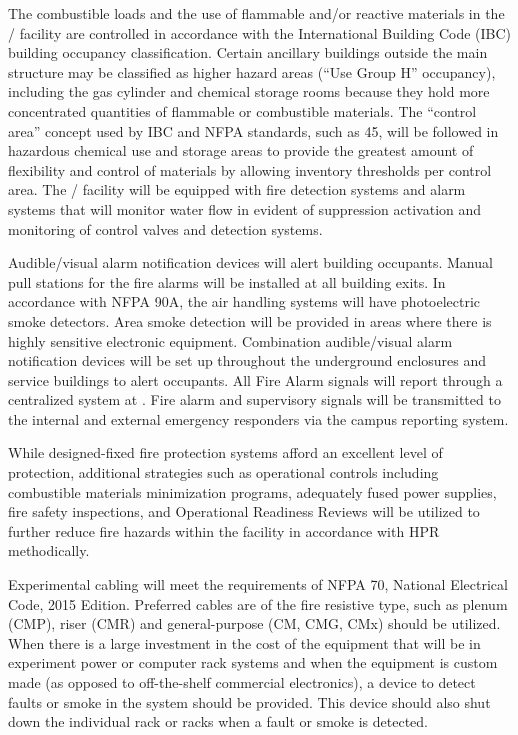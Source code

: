The combustible loads and the use of flammable and/or reactive
materials in the / facility are controlled in accordance with
the International Building Code (IBC) building occupancy
classification. Certain ancillary buildings outside the main structure
may be classified as higher hazard areas (``Use Group H'' occupancy),
including the gas cylinder and chemical storage rooms because they
hold more concentrated quantities of flammable or combustible
materials.  The ``control area'' concept used by IBC and NFPA standards,
such as 45, will be followed in hazardous chemical use and storage
areas to provide the greatest amount of flexibility and control of
materials by allowing inventory thresholds per control area.  The
/ facility will be equipped with fire detection systems and
alarm systems that will monitor water flow in evident of suppression
activation and monitoring of control valves and detection systems.

Audible/visual alarm notification devices will alert building
occupants.  Manual pull stations for the fire alarms will be installed
at all building exits.  In accordance with NFPA 90A, the air handling
systems will have photoelectric smoke detectors.  Area smoke detection
will be provided in areas where there is highly sensitive electronic
equipment.  Combination audible/visual alarm notification devices will
be set up throughout the underground enclosures and service buildings
to alert occupants. All Fire Alarm signals will report through a
centralized system at \surf.  Fire alarm and supervisory signals will
be transmitted to the internal and external emergency responders via
the campus reporting system.

While designed-fixed fire protection systems afford an excellent level
of protection, additional strategies such as operational controls
including combustible materials minimization programs, adequately
fused power supplies, fire safety inspections, and Operational
Readiness Reviews will be utilized to further reduce fire hazards
within the facility in accordance with  HPR methodically.

Experimental cabling will meet the requirements of NFPA 70, National
Electrical Code, 2015 Edition.  Preferred cables are of the fire
resistive type, such as plenum (CMP), riser (CMR) and
general-purpose (CM, CMG, CMx) should be utilized.  When there is a
large investment in the cost of the equipment that will be in
experiment power or computer rack systems and when the equipment is
custom made (as opposed to off-the-shelf commercial electronics), a
device to detect faults or smoke in the system should be provided.
This device should also shut down the individual rack or racks when a
fault or smoke is detected.


